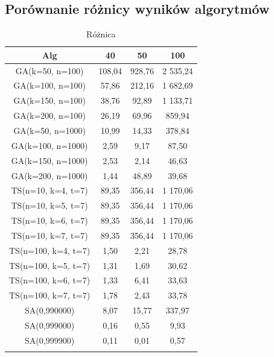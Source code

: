 \documentclass[wide,a4paper,titlepage,12pt] {article}
\begin{document}
\subsection{Porównanie różnicy wyników algorytmów}
\begin{center}
    \begin{longtable}{|c|c|c|c|}
        \hline
         Alg  & 40&  50 & 100 \\ \hline
        GA(k=50, n=100)& 108,04&  928,76 & 2 535,24\\ \hline
        GA(k=100, n=100)  &  57,86 &  212,16 & 1 682,69\\ \hline
        GA(k=150, n=100)  &  38,76  & 92,89&   1 133,71\\ \hline
        GA(k=200, n=100)   & 26,19  & 69,96 &  859,94\\ \hline
        GA(k=50, n=1000)   & 10,99 &  14,33 &  378,84\\ \hline
        GA(k=100, n=1000) & 2,59  &  9,17  &  87,50\\ \hline
        GA(k=150, n=1000) &  2,53  &  2,14 &   46,63\\ \hline
        GA(k=200, n=1000)  & 1,44   & 48,89&   39,68\\ \hline
        TS(n=10, k=4, t=7) & 89,35  & 356,44 & 1 170,06\\ \hline
        TS(n=10, k=5, t=7) & 89,35  & 356,44&  1 170,06\\ \hline
        TS(n=10, k=6, t=7) & 89,35 &  356,44&  1 170,06\\ \hline
        TS(n=10, k=7, t=7) & 89,35 &  356,44 & 1 170,06\\ \hline
        TS(n=100, k=4, t=7) &1,50 &   2,21 &   28,78\\ \hline
        TS(n=100, k=5, t=7) &1,31  &  1,69 &   30,62\\ \hline
        TS(n=100, k=6, t=7)& 1,33 &  6,41  &  33,63\\ \hline
        TS(n=100, k=7, t=7) &1,78  & 2,43  &  33,78\\ \hline
        SA(0,990000)  &  8,07   & 15,77 &  337,97\\ \hline
        SA(0,999000)  &  0,16  &  0,55  &  9,93\\ \hline
        SA(0,999900)  &  0,11  &  0,01 &   0,57\\ \hline
                \caption{Różnica}
    \end{longtable}

\end{center}
\end{document}
